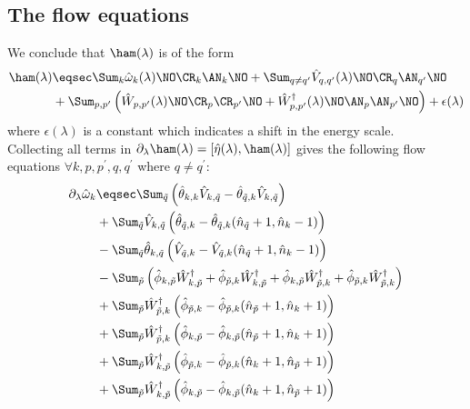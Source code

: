 \begin{appendix}
\section{The flow equations}
We conclude that $\ham(\lambda)$ is of the form 
\begin{align}
\ham(\lambda)&\eqsec\Sum_k \hat\omega_k(\lambda) \NO\CR_k\AN_k\NO+\Sum_{q\neq q^\prime}\hat V_{q,q^\prime}(\lambda)\NO\CR_q\AN_{q^\prime}\NO\\
&+\Sum_{p,p^\prime}\left(\hat W_{p,p^\prime}(\lambda)\NO\CR_p\CR_{p^\prime}\NO+\hat W_{p,p^\prime}^\dagger(\lambda)\NO\AN_p\AN_{p^\prime}\NO\right)+\epsilon(\lambda)\nonumber
\end{align}
where $\epsilon(\lambda)$ is a constant which indicates a shift in the energy scale.\\
Collecting all terms in $\partial_\lambda\ham(\lambda)=[\hat\eta(\lambda),\ham(\lambda)]$ gives the following flow equations $\forall k, p,p^\prime, q, q^\prime$ where $q\neq q^\prime$:
\begin{subequations}
\begin{align}
\partial_\lambda\hat\omega_k&\eqsec \Sum_{\tilde q} \left(\hat\theta_{k,k}\hat V_{k,\tilde q}-\hat\theta_{\tilde q,k}\hat V_{k,\tilde q}\right)  \\
&+\Sum_{\tilde q} \hat V_{k,\tilde q}\left(\hat\theta_{\tilde q,k}-\hat\theta_{\tilde q,k}(\hat n_{\tilde q}+1,\hat n_k-1)\right)\nonumber \\
&-\Sum_{\tilde q} \hat \theta_{k,\tilde q}\left(\hat V_{\tilde q,k}-\hat V_{\tilde q,k}(\hat n_{\tilde q}+1,\hat n_k-1)\right)\nonumber\\
&-\Sum_{\tilde p} \left(\hat\phi_{k,\tilde p}\hat W_{k,\tilde p}^\dagger+\hat\phi_{\tilde p,k}\hat W_{k,\tilde p}^\dagger+\hat\phi_{k,\tilde p}\hat W_{\tilde p,k}^\dagger  + \hat\phi_{\tilde p,k}\hat W_{\tilde p,k}^\dagger\right)\nonumber\\
&+\Sum_{\tilde p}\hat W_{\tilde p,k}^\dagger \left(\hat\phi_{ \tilde p,k}-\hat\phi_{ \tilde p,k}(\hat n_{\tilde p}+1,\hat n_{k}+1)\right) \nonumber\\
&+\Sum_{\tilde p}\hat W_{\tilde p,k}^\dagger \left(\hat\phi_{k,\tilde p}-\hat\phi_{k,\tilde p}(\hat n_{\tilde p}+1,\hat n_{k}+1)\right) \nonumber\\
&+\Sum_{\tilde p}\hat W_{k,\tilde p}^\dagger \left(\hat\phi_{\tilde p,k}-\hat\phi_{\tilde p,k}(\hat n_{k}+1,\hat n_{\tilde p}+1)\right) \nonumber\\
&+\Sum_{\tilde p}\hat W_{k,\tilde p}^\dagger \left(\hat\phi_{k, \tilde p}-\hat\phi_{k, \tilde p}(\hat n_{k}+1,\hat n_{\tilde p}+1)\right) \nonumber\\

\end{align}
\end{subequations}
\end{appendix}
